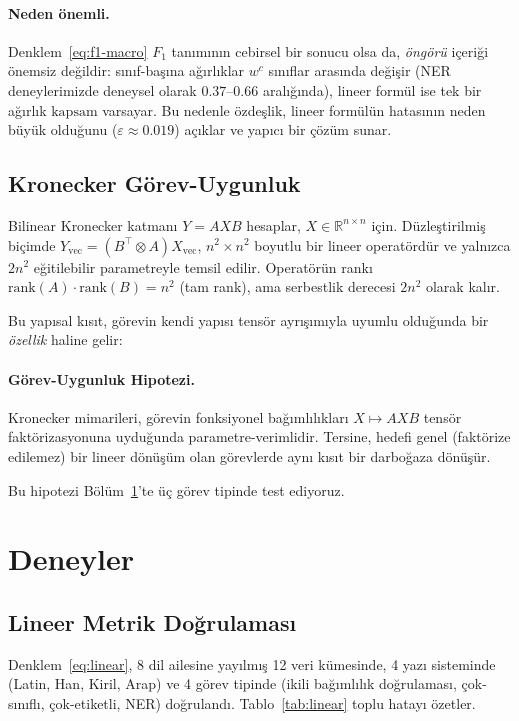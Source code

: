\documentclass[11pt,a4paper]{article}
\begin{document}
\paragraph{Neden önemli.}
Denklem~\ref{eq:f1-macro} $F_1$ tanımının cebirsel bir sonucu olsa da,
\emph{öngörü} içeriği önemsiz değildir: sınıf-başına ağırlıklar $w^c$
sınıflar arasında değişir (NER deneylerimizde deneysel olarak
$0.37$--$0.66$ aralığında), lineer formül ise tek bir ağırlık
$\text{kapsam}$ varsayar. Bu nedenle özdeşlik, lineer formülün
hatasının neden büyük olduğunu ($\varepsilon \approx 0.019$)
açıklar ve yapıcı bir çözüm sunar.

\subsection{Kronecker Görev-Uygunluk}
\label{sec:kronecker}

Bilinear Kronecker katmanı $Y = A X B$ hesaplar, $X \in \mathbb{R}^{n \times n}$
için. Düzleştirilmiş biçimde $Y_{\text{vec}} = (B^\top \otimes A) X_{\text{vec}}$,
$n^2 \times n^2$ boyutlu bir lineer operatördür ve yalnızca $2n^2$
eğitilebilir parametreyle temsil edilir. Operatörün rankı
$\text{rank}(A) \cdot \text{rank}(B) = n^2$ (tam rank), ama serbestlik
derecesi $2n^2$ olarak kalır.

Bu yapısal kısıt, görevin kendi yapısı tensör ayrışımıyla uyumlu
olduğunda bir \emph{özellik} haline gelir:

\paragraph{Görev-Uygunluk Hipotezi.}
Kronecker mimarileri, görevin fonksiyonel bağımlılıkları $X \mapsto A X B$
tensör faktörizasyonuna uyduğunda parametre-verimlidir. Tersine, hedefi
genel (faktörize edilemez) bir lineer dönüşüm olan görevlerde aynı kısıt
bir darboğaza dönüşür.

Bu hipotezi Bölüm~\ref{sec:experiments}'te üç görev tipinde test ediyoruz.


\section{Deneyler}
\label{sec:experiments}

\subsection{Lineer Metrik Doğrulaması}
\label{sec:exp-linear}

Denklem~\ref{eq:linear}, 8 dil ailesine yayılmış 12 veri kümesinde,
4 yazı sisteminde (Latin, Han, Kiril, Arap) ve 4 görev tipinde (ikili
bağımlılık doğrulaması, çok-sınıflı, çok-etiketli, NER) doğrulandı.
Tablo~\ref{tab:linear} toplu hatayı özetler.
\end{document}
